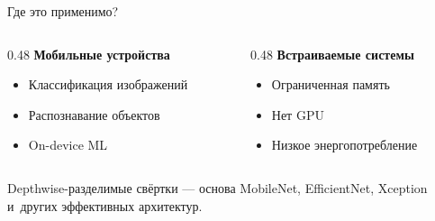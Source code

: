 \documentclass[11pt,aspectratio=169]{beamer}
\begin{document}
\begin{frame}{Где это применимо?}
  \begin{columns}[T]
    \begin{column}{0.48\textwidth}
      \centering
      \textbf{Мобильные устройства}
      \vspace{6pt}


      \begin{itemize}
        \item Классификация изображений
        \item Распознавание объектов
        \item On-device ML
      \end{itemize}
    \end{column}
    \begin{column}{0.48\textwidth}
      \centering
      \textbf{Встраиваемые системы}
      \vspace{6pt}


      \begin{itemize}
        \item Ограниченная память
        \item Нет GPU
        \item Низкое энергопотребление
      \end{itemize}
    \end{column}
  \end{columns}

  \vspace{8pt}
  \begin{alertblock}{}
    \centering
    Depthwise-разделимые свёртки — основа MobileNet, EfficientNet, Xception и~других
    эффективных архитектур.
  \end{alertblock}
\end{frame}
\end{document}
